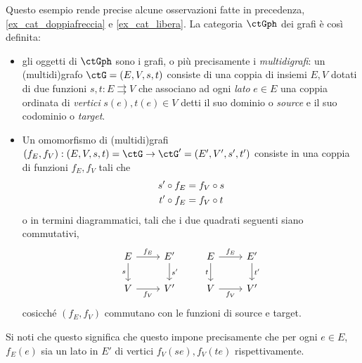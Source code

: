 \begin{example}\label{ex_cat_grafi}
	Questo esempio rende precise alcune osservazioni fatte in precedenza, \ref{ex_cat_doppiafreccia} e \ref{ex_cat_libera}. La categoria $\ctGph$ dei grafi è così definita: 
	\begin{itemize}
		\item gli oggetti di $\ctGph$ sono i grafi, o più precisamente i \emph{multidigrafi}: un (multidi)grafo $\ctG = (E,V,s,t)$ consiste di una coppia di insiemi \(E,V\) dotati di due funzioni \(s,t : E\rightrightarrows V\) che associano ad ogni \emph{lato} \(e\in E\) una coppia ordinata di \emph{vertici} \(s(e),t(e)\in V\) detti il suo dominio o \emph{source} e il suo codominio o \emph{target}.
		\item Un omomorfismo di (multidi)grafi $(f_E,f_V) : (E,V,s,t)=\ctG\to\ctG'= (E', V',s',t')$ consiste in una coppia di funzioni $f_E, f_V$ tali che 
		\begin{gather*}
			s'\circ f_E = f_V\circ s\\
			t'\circ f_E = f_V\circ t
		\end{gather*}
		o in termini diagrammatici, tali che i due quadrati seguenti siano commutativi,
\[\begin{tikzcd}
	E & {E'} & E & {E'} \\
	V & {V'} & V & {V'}
	\arrow["{f_E}", from=1-1, to=1-2]
	\arrow["{s'}", from=1-2, to=2-2]
	\arrow["{f_V}"', from=2-1, to=2-2]
	\arrow["s"', from=1-1, to=2-1]
	\arrow["{f_E}", from=1-3, to=1-4]
	\arrow["{f_V}"', from=2-3, to=2-4]
	\arrow["{t'}", from=1-4, to=2-4]
	\arrow["t"', from=1-3, to=2-3]
\end{tikzcd}\]
		cosicché $(f_E,f_V)$ commutano con le funzioni di source e target.
	\end{itemize}
	Si noti che questo significa che questo impone precisamente che per ogni $e\in E$, $f_E(e)$ sia un lato in $E'$ di vertici $f_V(se), f_V(te)$ rispettivamente.
\end{example}
